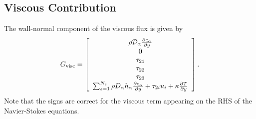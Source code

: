 %


\subsection{Viscous Contribution}
\label{sec:viscous_implicit_operator}
The wall-normal component of the viscous flux is given by
%
\begin{equation*}
G_{\mathrm{visc}} = \left[ \begin{array}{c}
\rho \mathcal{D}_{\alpha} \frac{\partial c_{\alpha}}{\partial y} \\
0 \\
\tau_{21} \\
\tau_{22} \\
\tau_{23} \\
\sum_{s=1}^{N_s} \rho D_{\alpha} h_{\alpha} \frac{\partial c_{\alpha}}{\partial y} + \tau_{2i} u_i + \kappa \frac{\partial T}{\partial y}
\end{array} \right].
\end{equation*}
% 
Note that the signs are correct for the viscous term appearing on the
RHS of the Navier-Stokes equations.

